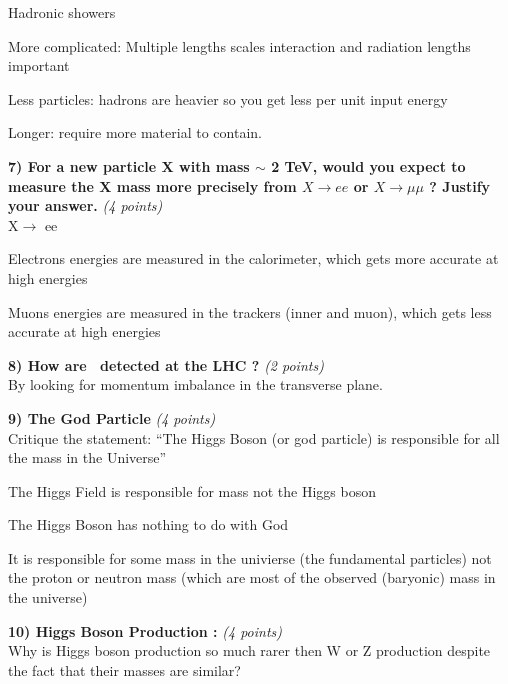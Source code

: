 {Hadronic showers
\bi
\item[-] More complicated:  Multiple lengths scales interaction and radiation lengths important
\item[-] Less particles:  hadrons are heavier so you get less per unit input energy
\item[-] Longer: require more material to contain. 
\ei



\textbf{7) For a new particle X with mass $\sim$ 2 TeV,  would you expect to measure the X mass more precisely from $X\rightarrow ee$ or $X \rightarrow \mu\mu$ ? Justify your answer.} \hfill \textit{(4 points)}\\

X$\rightarrow$ ee
\bi
\item[-] Electrons energies are measured in the calorimeter, which gets more accurate at high energies
\item[-] Muons energies are measured in the trackers (inner and muon), which gets less accurate at high energies
\ei

\vspace*{0.5in}



\textbf{8) How are \nus\ detected at the LHC ?} \hfill \textit{(2 points)}\\

\bc
By looking for momentum imbalance in the transverse plane.
\ec


\textbf{9) The God Particle } \hfill \textit{(4 points)} \\ 
Critique the statement:  ``The Higgs Boson (or god particle) is responsible for all the mass in the Universe''

\bi
\item[-] The Higgs Field is responsible for mass not the Higgs boson
\item[-] The Higgs Boson has nothing to do with God
\item[-] It is responsible for some mass in the univierse (the fundamental particles) not the proton or neutron mass (which are most of the observed (baryonic) mass in the universe) 
\ei

\vspace*{0.3in}



\textbf{10) Higgs Boson Production : } \hfill \textit{(4 points)}\\
Why is Higgs boson production so much rarer then W or Z production despite the fact that their masses are similar?    


}
